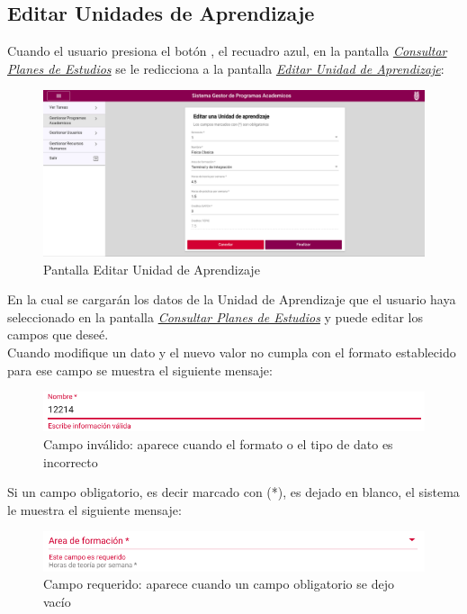 \subsection{Editar Unidades de Aprendizaje}
Cuando el usuario presiona el botón \BtnLapiz, el recuadro azul, en la pantalla \hyperlink{consultarUA}{\textit{Consultar Planes de Estudios}} se le redicciona a la pantalla \hyperlink{editarUA}{\textit{Editar Unidad de Aprendizaje}}:\\
\begin{figure}[H]
    \centering
    \hypertarget{editarUA}{\includegraphics[width=0.7\linewidth]{images/GUA/editarUA}}
    \caption{Pantalla Editar Unidad de Aprendizaje}
    \label{editarUA}
\end{figure}
En la cual se cargarán los datos de la Unidad de Aprendizaje que el usuario haya seleccionado en la pantalla \hyperlink{consultarUA}{\textit{Consultar Planes de Estudios}}  y puede editar los campos que deseé.\\
Cuando modifique un dato y el nuevo valor no cumpla con el formato establecido para ese campo se muestra el siguiente mensaje:\\
\begin{figure}[H]
    \centering
    \hypertarget{invalidoE}{\includegraphics[width=0.7\linewidth]{images/GUA/invalido}}
    \caption{Campo inválido: aparece cuando el formato o el tipo de dato es incorrecto}
    \label{invalidoE}
\end{figure}
Si un campo  obligatorio, es decir marcado con (*), es dejado en blanco, el sistema le muestra el siguiente mensaje:\\
\begin{figure}[H]
    \centering
    \hypertarget{requeridoE}{\includegraphics[width=0.7\linewidth]{images/GUA/requerido}}
    \caption{Campo requerido: aparece cuando un campo obligatorio se dejo vacío}
    \label{requeridoE}
\end{figure}
